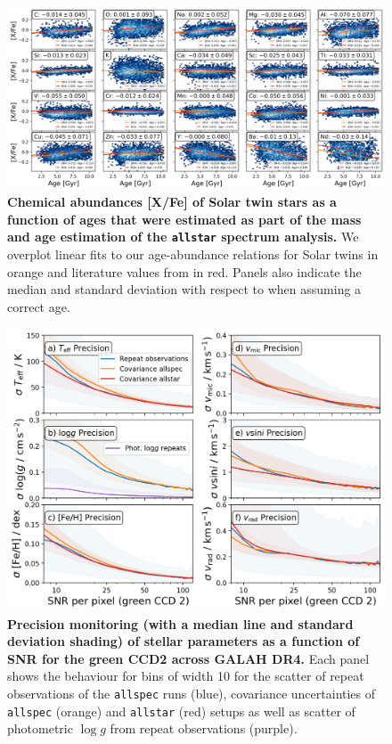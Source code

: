 \documentclass[
  journal=pasa,
  manuscript=research-paper, %
  year=2024,
  volume=37
]{cup-journal}
\newcommand{\logg}{$\log g$\xspace}
\begin{document}
\begin{figure}[ht]
 \centering
 \includegraphics[width=\textwidth]{figures/galah_dr4_age_xfe_trends_solar_twins_allstar.png}
 \caption{\textbf{Chemical abundances [X/Fe] of Solar twin stars as a function of ages that were estimated as part of the mass and age estimation of the \texttt{allstar} spectrum analysis.} We overplot linear fits to our age-abundance relations for Solar twins in orange and literature values from \citet{Bedell2018} in red. Panels also indicate the median and standard deviation with respect to \citet{Bedell2018} when assuming a correct age.}
 \label{fig:galah_dr4_age_xfe_trends_solar_twins_allstar}
\end{figure}

\begin{figure}[ht]
 \centering
 \includegraphics[width=\textwidth]{figures/galah_dr4_precision_parameters.png}
 \caption{\textbf{Precision monitoring (with a median line and standard deviation shading) of stellar parameters as a function of SNR for the green CCD2 across GALAH DR4.} Each panel shows the behaviour for bins of width 10 for the scatter of repeat observations of the \texttt{allspec} runs (blue), covariance uncertainties of \texttt{allspec} (orange) and \texttt{allstar} (red) setups as well as scatter of photometric \logg from repeat observations (purple).}
 \label{fig:galah_dr4_precision_parameters}
\end{figure}
\end{document}
